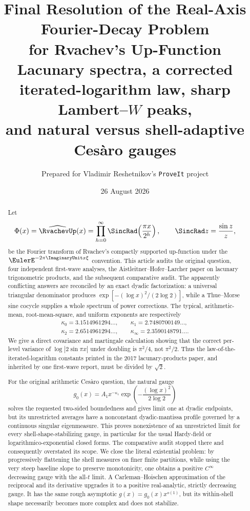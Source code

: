 \documentclass[11pt]{article}
\title{\bfseries Final Resolution of the Real-Axis Fourier-Decay Problem\\
for Rvachev's Up-Function\\[0.4em]
\large Lacunary spectra, a corrected iterated-logarithm law, sharp Lambert--\(W\) peaks,\\
and natural versus shell-adaptive Ces\`aro gauges}
\author{Prepared for Vladimir Reshetnikov's \texttt{ProveIt} project}
\date{26 August 2026}
\theoremstyle{definition}
\theoremstyle{remark}
\begin{document}
\maketitle

\begin{abstract}
Let
\[
 \Phi(x)=\widehat{\RvachevUp}(x)
 =\prod_{h=0}^{\infty}\SincRad\!\left(\frac{\pi x}{2^h}\right),
 \qquad \SincRad z=\frac{\sin z}{z},
\]
be the Fourier transform of Rvachev's compactly supported up-function under the
\(\EulerE^{-2\pi\ImaginaryUnit x\xi}\) convention.  This article audits the original question,
four independent first-wave analyses, the Aistleitner--Hofer--Larcher paper on
lacunary trigonometric products, and the subsequent comparative audit.  The
apparently conflicting answers are reconciled by an exact dyadic factorization:
a universal triangular denominator produces
\(\exp[-(\log x)^2/(2\log2)]\), while a Thue--Morse sine cocycle supplies a
whole spectrum of power corrections.  The typical, arithmetic-mean,
root-mean-square, and uniform exponents are respectively
\[
 \begin{gathered}
 \kappa_0=3.1514961294\ldots,\qquad
 \kappa_1=2.7480700149\ldots,\\
 \kappa_2=2.6514961294\ldots,\qquad
 \kappa_\infty=2.3590148791\ldots.
 \end{gathered}
\]
We give a direct covariance and martingale calculation showing that the correct
per-level variance of \(\log|2\sin\pi x|\) under doubling is \(\pi^2/4\), not
\(\pi^2/2\).  Thus the law-of-the-iterated-logarithm constants printed in the
2017 lacunary-products paper, and inherited by one first-wave report, must be
divided by \(\sqrt2\).

For the original arithmetic Ces\`aro question, the natural gauge
\[
 g_0(x)=A_1x^{-\kappa_1}
 \exp\!\left(-\frac{(\log x)^2}{2\log2}\right)
\]
solves the requested two-sided boundedness and gives limit one at dyadic
endpoints, but its unrestricted averages have a nonconstant dyadic-mantissa
profile governed by a continuous singular eigenmeasure.  This proves
nonexistence of an unrestricted limit for every shell-shape-stabilizing gauge,
in particular for the usual Hardy-field or logarithmico-exponential closed
forms.  The comparative audit stopped there and consequently overstated its
scope.  We close the literal existential problem: by progressively flattening
the shell measures on finer finite partitions, while using the very steep
baseline slope to preserve monotonicity, one obtains a positive \(C^\infty\)
decreasing gauge with the all-\(t\) limit.  A Carleman--Hoischen approximation
of the reciprocal and its derivative upgrades it to a positive real-analytic,
strictly decreasing gauge.  It has the same rough asymptotic
\(g(x)=g_0(x)x^{o(1)}\), but its within-shell shape necessarily becomes more
complex and does not stabilize.


\end{abstract}
\end{document}

